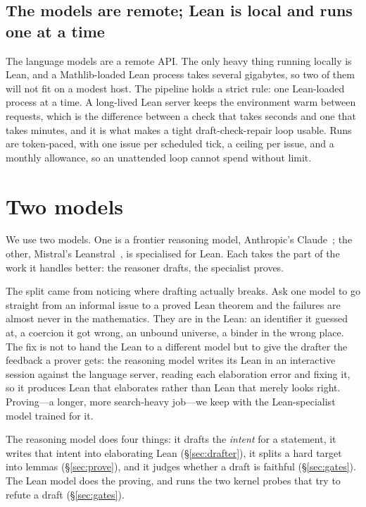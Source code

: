 \documentclass[11pt]{article}
\begin{document}
\subsection{The models are remote; Lean is local and runs one at a time}
The language models are a remote API. The only heavy thing running locally is Lean, and
a Mathlib-loaded Lean process takes several gigabytes, so two of them will not fit on a
modest host. The pipeline holds a strict rule: one Lean-loaded process at a time. A
long-lived Lean server keeps the environment warm between requests, which is the
difference between a check that takes seconds and one that takes minutes, and it is what
makes a tight draft-check-repair loop usable. Runs are token-paced, with one issue per
scheduled tick, a ceiling per issue, and a monthly allowance, so an unattended loop
cannot spend without limit.

\section{Two models}\label{sec:engines}

We use two models. One is a frontier reasoning model, Anthropic's
Claude~\cite{anthropicClaude}; the other, Mistral's Leanstral~\cite{leanstral2026}, is
specialised for Lean. Each takes the part of the work it handles better: the reasoner
drafts, the specialist proves.

The split came from noticing where drafting actually breaks. Ask one model to go straight
from an informal issue to a proved Lean theorem and the failures are almost never in the
mathematics. They are in the Lean: an identifier it guessed at, a coercion it got wrong,
an unbound universe, a binder in the wrong place. The fix is not to hand the Lean to a
different model but to give the drafter the feedback a prover gets: the reasoning model
writes its Lean in an interactive session against the language server, reading each
elaboration error and fixing it, so it produces Lean that elaborates rather than Lean
that merely looks right. Proving---a longer, more search-heavy job---we keep with the
Lean-specialist model trained for it.

The reasoning model does four things: it drafts the \emph{intent} for a statement, it
writes that intent into elaborating Lean (\S\ref{sec:drafter}), it splits a hard target
into lemmas (\S\ref{sec:prove}), and it judges whether a draft is faithful
(\S\ref{sec:gates}). The Lean model does the proving, and runs the two kernel probes that
try to refute a draft (\S\ref{sec:gates}).
\end{document}
